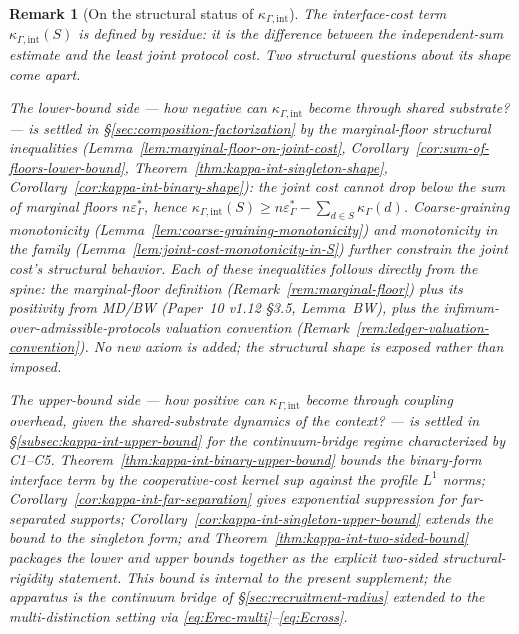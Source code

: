 \documentclass[11pt]{article}
\newtheorem{remark}[theorem]{Remark}
\begin{document}
\begin{remark}[On the structural status of $\kappa_{\Gamma,\mathrm{int}}$]\label{rem:kappa-int-placeholder}
The interface-cost term $\kappa_{\Gamma,\mathrm{int}}(S)$ is defined by residue: it is the difference between the independent-sum estimate and the least joint protocol cost.  Two structural questions about its shape come apart.

The \emph{lower-bound side} --- how negative can $\kappa_{\Gamma,\mathrm{int}}$ become through shared substrate? --- is settled in \S\ref{sec:composition-factorization} by the marginal-floor structural inequalities (Lemma~\ref{lem:marginal-floor-on-joint-cost}, Corollary~\ref{cor:sum-of-floors-lower-bound}, Theorem~\ref{thm:kappa-int-singleton-shape}, Corollary~\ref{cor:kappa-int-binary-shape}): the joint cost cannot drop below the sum of marginal floors $n\varepsilon^*_\Gamma$, hence $\kappa_{\Gamma,\mathrm{int}}(S) \ge n\varepsilon^*_\Gamma - \sum_{d\in S}\kappa_\Gamma(d)$.  Coarse-graining monotonicity (Lemma~\ref{lem:coarse-graining-monotonicity}) and monotonicity in the family (Lemma~\ref{lem:joint-cost-monotonicity-in-S}) further constrain the joint cost's structural behavior.  Each of these inequalities follows directly from the spine: the marginal-floor definition (Remark~\ref{rem:marginal-floor}) plus its positivity from MD/BW (Paper~10 v1.12 \S3.5, Lemma~BW), plus the infimum-over-admissible-protocols valuation convention (Remark~\ref{rem:ledger-valuation-convention}).  No new axiom is added; the structural shape is exposed rather than imposed.

The \emph{upper-bound side} --- how positive can $\kappa_{\Gamma,\mathrm{int}}$ become through coupling overhead, given the shared-substrate dynamics of the context? --- is settled in \S\ref{subsec:kappa-int-upper-bound} for the continuum-bridge regime characterized by C1--C5.  Theorem~\ref{thm:kappa-int-binary-upper-bound} bounds the binary-form interface term by the cooperative-cost kernel sup against the profile $L^1$ norms; Corollary~\ref{cor:kappa-int-far-separation} gives exponential suppression for far-separated supports; Corollary~\ref{cor:kappa-int-singleton-upper-bound} extends the bound to the singleton form; and Theorem~\ref{thm:kappa-int-two-sided-bound} packages the lower and upper bounds together as the explicit two-sided structural-rigidity statement.  This bound is internal to the present supplement; the apparatus is the continuum bridge of \S\ref{sec:recruitment-radius} extended to the multi-distinction setting via \eqref{eq:Erec-multi}--\eqref{eq:Ecross}.


\end{remark}
\end{document}
